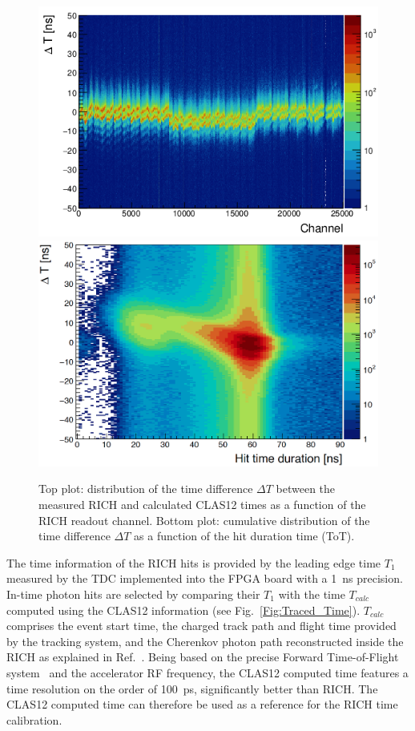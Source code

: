 \documentclass[5p,times,twocolumn]{elsarticle}
\begin{document}
\begin{figure}[t]
\begin{center}
\includegraphics[width=0.85\columnwidth]{dt_vs_anode_nocor.png}
\includegraphics[width=0.85\columnwidth]{dt_vs_dur_nocor.png}
\end{center}
\caption{Top plot: distribution of the time difference $\Delta T$ between the measured RICH and calculated CLAS12
  times as a function of the RICH readout channel. Bottom plot: cumulative distribution of the time difference
  $\Delta T$ as a function of the hit duration time (ToT).}
\label{fig:Time_uncorr}
\end{figure}
The time information of the RICH hits is provided by the leading edge time $T_1$ measured by the TDC implemented
into the FPGA board with a 1~ns precision. In-time photon hits are selected by comparing their $T_1$ with the time
$T_{calc}$ computed using the CLAS12 information (see Fig.~\ref{Fig:Traced_Time}). $T_{calc}$ comprises the event
start time, the charged track path and flight time provided by the tracking system, and the Cherenkov photon path
reconstructed inside the RICH as explained in Ref.~\cite{recon-nim}. Being based on the precise Forward Time-of-Flight
system~\cite{REF:ftof-nim} and the accelerator RF frequency, the CLAS12 computed time features a time resolution on the order of 100~ps,
significantly better than RICH. The CLAS12 computed time can therefore be used as a reference for the RICH time calibration.
\end{document}
